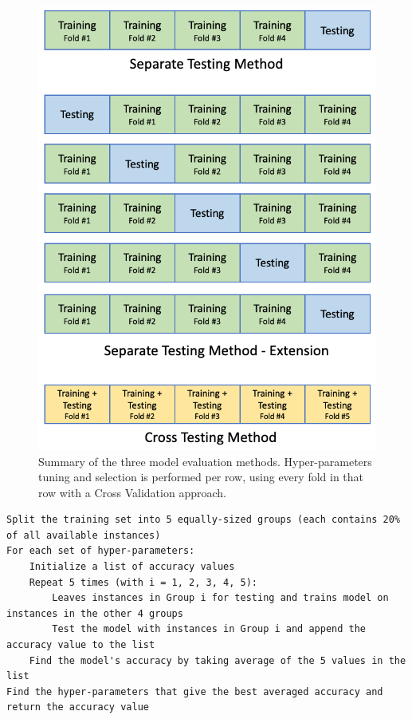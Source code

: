 \documentclass[letterpaper,twocolumn,10pt]{article}
\begin{document}
\begin{figure}[]
    \includegraphics[width=\linewidth]{Figures/testing_methods.png}
    \centering
    \caption{Summary of the three model evaluation methods. Hyper-parameters tuning and selection is performed per row, using every fold in that row with a Cross Validation approach.}
    \label{fig:testing_methods}
\end{figure}

\begin{lstlisting}[basicstyle=\scriptsize, float=*, label={lst:cross-testing}, caption={Pseudocode for the Cross Testing Procedure}]
Split the training set into 5 equally-sized groups (each contains 20% of all available instances)
For each set of hyper-parameters:
    Initialize a list of accuracy values
    Repeat 5 times (with i = 1, 2, 3, 4, 5):
        Leaves instances in Group i for testing and trains model on instances in the other 4 groups
        Test the model with instances in Group i and append the accuracy value to the list
    Find the model's accuracy by taking average of the 5 values in the list
Find the hyper-parameters that give the best averaged accuracy and return the accuracy value
\end{lstlisting}
\end{document}
